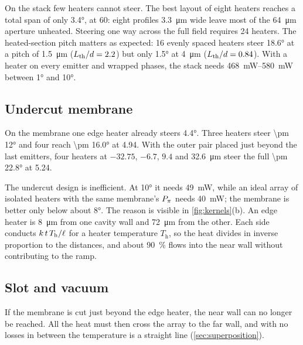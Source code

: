 On the  stack few heaters cannot steer. The best layout of eight heaters reaches a total span of
only \ang{3.4}, at \qty{60}{\mWdeg}: eight profiles \qty{3.3}{\micro\metre} wide leave most of the
\qty{64}{\micro\metre} aperture unheated. Steering one way across the full field requires \num{24} heaters. The
heated-section pitch matters as expected: \num{16} evenly spaced heaters steer \ang{18.6} at a
pitch of \qty{1.5}{\micro\metre} ($L_{\mathrm{th}}/d=2.2$) but only \ang{1.5} at \qty{4}{\micro\metre} ($L_{\mathrm{th}}/d=0.84$). With a
heater on every emitter and wrapped phases, the  stack needs \qtyrange{468}{580}{\milli\watt} between
\ang{1} and \ang{10}.
\subsection{Undercut membrane}
\label{sec:undercut}

On the  membrane one edge heater already steers \ang{4.4}. Three heaters steer \ang{\pm 12} and four
reach \ang{\pm 16.0} at \qty{4.94}{\mWdeg}. With the outer pair placed just beyond the last emitters, four heaters
at $-32.75$, $-6.7$, $9.4$ and \qty{32.6}{\micro\metre} steer the full \ang{\pm 22.8} at \qty{5.24}{\mWdeg}.

The undercut design is inefficient. At \ang{10} it needs \qty{49}{\milli\watt}, while an ideal array of isolated
heaters with the same membrane's $P_{\pi}$ needs \qty{40}{\milli\watt}; the membrane is better only below about
\ang{8}. The reason is visible in \cref{fig:kernels}(b). An edge heater is \qty{8}{\micro\metre} from one cavity wall
and \qty{72}{\micro\metre} from the other. Each side conducts $k\,t\,T_\mathrm{h}/\ell$ for a heater temperature $T_\mathrm{h}$, so the heat divides in inverse
proportion to the distances, and about \qty{90}{\percent} flows into the near wall without contributing to the ramp.

\subsection{Slot and vacuum}
\label{sec:slot}

If the membrane is cut just beyond the edge heater, the near wall can no longer be reached. All the heat must then
cross the array to the far wall, and with no losses in between the temperature is a straight line
(\cref{sec:superposition}).

